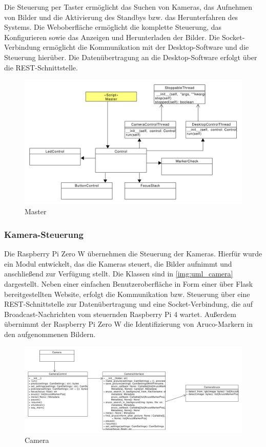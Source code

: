 \documentclass[./00PhotoBox.tex]{subfiles}
\begin{document}
Die Steuerung per Taster ermöglicht das Suchen von Kameras, das Aufnehmen von Bilder und die Aktivierung des Standbys bzw. das Herunterfahren des Systems. Die Weboberfläche ermöglicht die komplette Steuerung, das Konfigurieren sowie das Anzeigen und Herunterladen der Bilder. Die Socket-Verbindung ermöglicht die Kommunikation mit der Desktop-Software und die Steuerung hierüber. Die Datenübertragung an die Desktop-Software erfolgt über die REST-Schnittstelle.

\begin{figure}
    \centering
    \includegraphics[width=1\textwidth]{./img/uml/uml_master_classdiagramm.pdf}
    \caption{Master} %
    \label{img:master} %
\end{figure}


\subsubsection{Kamera-Steuerung}
Die Raspberry Pi Zero W übernehmen die Steuerung der Kameras. Hierfür wurde ein Modul entwickelt, das die Kameras steuert, die Bilder aufnimmt und anschließend zur Verfügung stellt. Die Klassen sind in \autoref{img:uml_camera} dargestellt. Neben einer einfachen Benutzeroberfläche in Form einer über Flask bereitgestellten Website, erfolgt die Kommunikation bzw. Steuerung über eine REST-Schnittstelle zur Datenübertragung und eine Socket-Verbindung, die auf Broadcast-Nachrichten vom steuernden Raspberry Pi 4 wartet. Außerdem übernimmt der Raspberry Pi Zero W die Identifizierung von Aruco-Markern in den aufgenommenen Bildern.

\begin{figure}
    \centering
    \includegraphics[width=1\textwidth]{./img/uml/uml_camera_classdiagramm.pdf}
    \caption{Camera} %
    \label{img:uml_camera} %
\end{figure}
\end{document}
